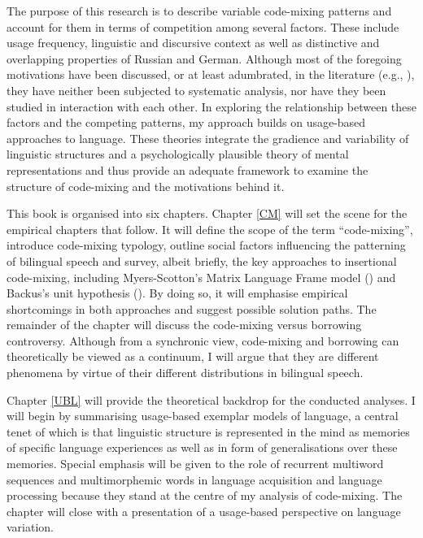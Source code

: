 The purpose of this research is to describe  variable code-mixing patterns and account for them in terms of competition among several factors. These include usage frequency, linguistic and discursive context as well as distinctive and overlapping properties of Russian and German. Although most of the foregoing motivations have been discussed, or at least adumbrated, in the literature (e.g., \citealt{myers-scotton-duelling-1993,myers-scotton-contact-2002,backus-two-1996,backus-units-2003,boumans-syntax-1998,muysken-bilingual-2000,}), they have neither been subjected to systematic analysis, nor have they been studied in interaction with each other. In exploring the relationship between these factors and the competing patterns, my approach builds on usage-based approaches to language. These theories integrate the gradience and variability of linguistic structures and a psychologically plausible theory of mental representations and thus provide an adequate framework to examine the structure of code-mixing and the motivations behind it.

This book is organised into six chapters. Chapter \ref{CM} will set the scene for the empirical chapters that follow. It will define the scope of the term “code-mixing”, introduce  code-mixing typology, outline social factors influencing the patterning of bilingual speech and survey, albeit briefly, the key approaches to insertional code-mixing, including Myers-Scotton's Matrix Language Frame model (\citeyear{myers-scotton-contact-2002,myers-scotton-duelling-1993}) and Backus's unit hypothesis (\citeyear{backus-units-2003}). By doing so, it will emphasise empirical shortcomings in both approaches and suggest possible solution paths. The remainder of the chapter will discuss the code-mixing versus borrowing controversy. Although from a synchronic view, code-mixing and borrowing can theoretically be viewed as a continuum, I will argue that they are different phenomena by virtue of their different distributions in bilingual speech.

Chapter \ref{UBL} will provide the theoretical backdrop for the conducted analyses. I will begin by summarising usage-based exemplar models of language, a central tenet of which is that linguistic structure is represented in the mind as memories of specific language experiences as well as in form of generalisations over these memories. Special emphasis will be given to the role of recurrent multiword sequences and multimorphemic words in language acquisition and language processing because they stand at the centre of my analysis of code-mixing. The chapter will close with a presentation of a usage-based perspective on language variation.


